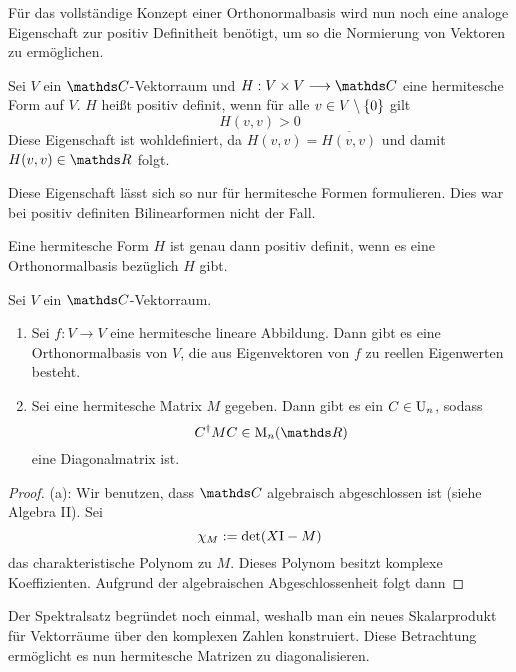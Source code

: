			Für das vollständige Konzept einer Orthonormalbasis wird nun noch eine analoge Eigenschaft zur positiv Definitheit benötigt, um so die Normierung von Vektoren zu ermöglichen.

			\begin{definition}
				Sei $V$ ein $\SC$-Vektorraum und $H:V\times V\longrightarrow\SC$ eine hermitesche Form auf $V$.
				$H$ heißt positiv definit, wenn für alle $v\in V\setminus\left\{ 0 \right\}$ gilt
				\[ H(v,v) > 0 \]
				Diese Eigenschaft ist wohldefiniert, da $H(v,v) = \overline{H(v,v)}$ und damit $H(v,v)\in\SR$ folgt.
			\end{definition}

			Diese Eigenschaft lässt sich so nur für hermitesche Formen formulieren.
			Dies war bei positiv definiten Bilinearformen nicht der Fall.

			\begin{theorem}
				Eine hermitesche Form $H$ ist genau dann positiv definit, wenn es eine Orthonormalbasis bezüglich $H$ gibt.
			\end{theorem}

			\begin{theorem}[Spektralsatz]
				Sei $V$ ein $\SC$-Vektorraum.
				\begin{enumerate}[label = \normalfont (\alph*)]
					\item Sei $f:V\longrightarrow V$ eine hermitesche lineare Abbildung.
						Dann gibt es eine Orthonormalbasis von $V$, die aus Eigenvektoren von $f$ zu reellen Eigenwerten besteht.

					\item Sei eine hermitesche Matrix $M$ gegeben.
						Dann gibt es ein $C\in\mathrm{U}_n$, sodass
						\[ C^\dagger MC \in\m{M}_n(\SR) \]
						eine Diagonalmatrix ist.
				\end{enumerate}
			\end{theorem}
			\begin{proof}
				(a):
				Wir benutzen, dass $\SC$ algebraisch abgeschlossen ist (siehe Algebra II).
				Sei
				\[ \chi_M := \det (X\mathrm{I} - M) \]
				das charakteristische Polynom zu $M$.
				Dieses Polynom besitzt komplexe Koeffizienten.
				Aufgrund der algebraischen Abgeschlossenheit folgt dann 
			\end{proof}

			Der Spektralsatz begründet noch einmal, weshalb man ein neues Skalarprodukt für Vektorräume über den komplexen Zahlen konstruiert.
			Diese Betrachtung ermöglicht es nun hermitesche Matrizen zu diagonalisieren.

